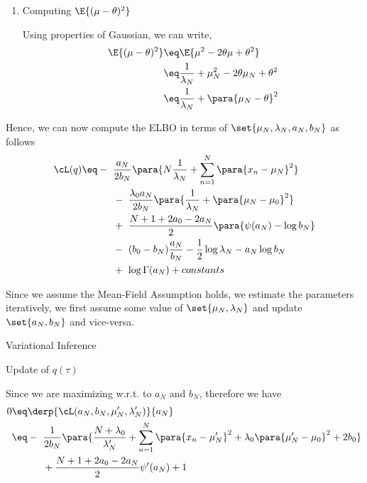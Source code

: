 \documentclass{article}
\begin{document}
\begin{question}
\begin{enumerate}[label=\bt{\theenumi.}]
		\item Computing $\E{(\mu - \theta)^2}$

			Using properties of Gaussian, we can write,
			\begin{align*}
				\E{(\mu - \theta)^2}	&\eq	\E{\mu^2 - 2 \theta \mu + \theta^2} \\
				&\eq	\frac{1}{\lambda_N} +  \mu_N^2 - 2 \theta \mu_N + \theta^2 \\
				&\eq	\frac{1}{\lambda_N} + \para{\mu_N - \theta}^2
			\end{align*}

	\end{enumerate}

	Hence, we can now compute the ELBO in terms of $\set{\mu_N, \lambda_N, a_N, b_N}$ as follows
	\begin{align*}
		\cL(q)	&\eq	- \ \frac{a_N}{2 b_N} \para{N \frac{1}{\lambda_N} + \sum_{n = 1}^N \para{x_n - \mu_N}^2} \\
		&\hspace{1.1cm} - \ \frac{\lambda_0 a_N}{2 b_N} \para{\frac{1}{\lambda_N} + \para{\mu_N - \mu_0}^2} \\
		&\hspace{1.1cm} + \ \frac{N + 1 + 2 a_0 - 2 a_N}{2} \para{\psi(a_N) - \log{b_N}} \\
		&\hspace{1.1cm} - \ (b_0 - b_N) \frac{a_N}{b_N} - \frac{1}{2} \log{\lambda_N} - a_N \log{b_N} \\
		&\hspace{1.1cm} + \ \log{\Gamma(a_N)} + constants
	\end{align*}

	Since we assume the Mean-Field Assumption holds, we estimate the parameters iteratively, \ie we first assume some value of $\set{\mu_N, \lambda_N}$ and update $\set{a_N, b_N}$ and vice-versa.

	\begin{qsection}{Variational Inference}

		\begin{qsubsection}{\boldmath Update of $q(\tau)$}

			Since we are maximizing w.r.t. to $a_N$ and $b_N$, therefore we have
			\begin{align*}
				0	&\eq	\derp{\cL(a_N, b_N, \mu'_N, \lambda'_N)}{a_N} \\
				&\eq	- \ \frac{1}{2 b_N} \para{\frac{N + \lambda_0}{\lambda'_N} + \sum_{n = 1}^N \para{x_n - \mu'_N}^2 + \lambda_0 \para{\mu'_N - \mu_0}^2 + 2 b_0} \\
				&\hspace{1.1cm} + \frac{N + 1 + 2 a_0 - 2 a_N}{2} \psi'(a_N) + 1
			\end{align*}


\end{qsubsection}
\end{qsection}
\end{question}
\end{document}
